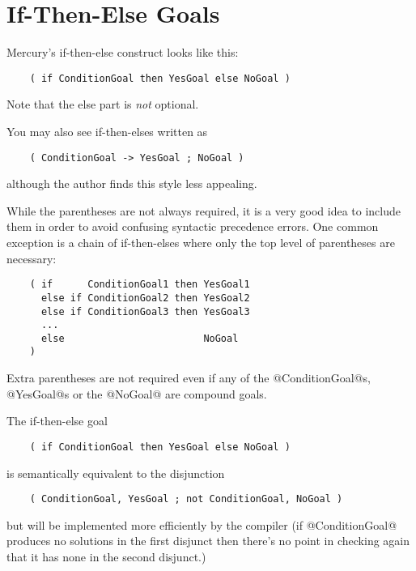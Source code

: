 \section{If-Then-Else Goals}

Mercury's if-then-else construct looks like this:
\begin{verbatim}
    ( if ConditionGoal then YesGoal else NoGoal )
\end{verbatim}
Note that the else part is \emph{not} optional.  

You may also see if-then-elses written as
\begin{verbatim}
    ( ConditionGoal -> YesGoal ; NoGoal )
\end{verbatim}
although the author finds this style less appealing.

While the parentheses are not always required, it is a very
good idea to include them in order to avoid confusing
syntactic precedence errors.  One common exception is a chain
of if-then-elses where only the top level of parentheses are
necessary:
\begin{verbatim}
    ( if      ConditionGoal1 then YesGoal1
      else if ConditionGoal2 then YesGoal2
      else if ConditionGoal3 then YesGoal3
      ...
      else                        NoGoal
    )
\end{verbatim}
Extra parentheses are not required even if any of the @ConditionGoal@s,
@YesGoal@s or the @NoGoal@ are compound goals.

The if-then-else goal
\begin{verbatim}
    ( if ConditionGoal then YesGoal else NoGoal )
\end{verbatim}
is semantically equivalent to the disjunction
\begin{verbatim}
    ( ConditionGoal, YesGoal ; not ConditionGoal, NoGoal )
\end{verbatim}
but will be implemented more efficiently by the compiler (if
@ConditionGoal@ produces no solutions in the first disjunct then
there's no point in checking again that it has none in the
second disjunct.)

